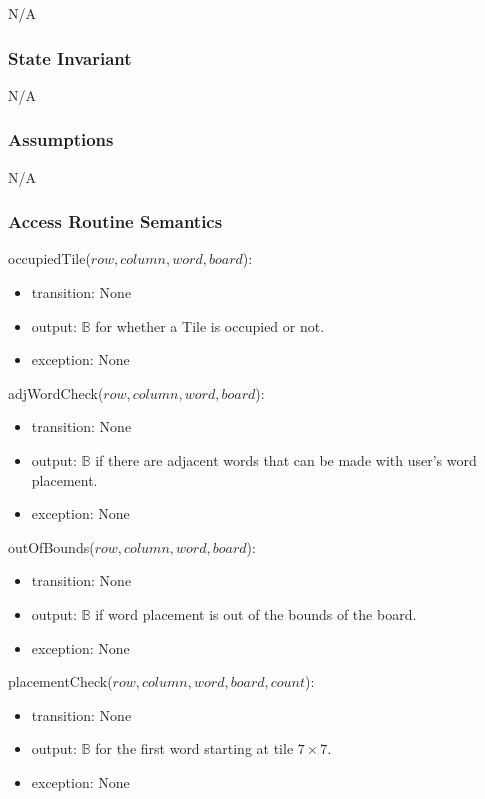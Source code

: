 \documentclass[12pt]{article}
\begin{document}
N/A

\subsubsection*{State Invariant}

N/A

\subsubsection*{Assumptions}

N/A

\subsubsection* {Access Routine Semantics}

\noindent occupiedTile($row, column, word, board$):
\begin{itemize}
\item transition: None
\item output: $\mathbb{B}$ for whether a Tile is occupied or not.
\item exception: None
\end{itemize}

\noindent adjWordCheck($row, column, word, board$):
\begin{itemize}
\item transition: None
\item output: $\mathbb{B}$ if there are adjacent words that can be made with user's word placement.
\item exception: None
\end{itemize}

\noindent outOfBounds($row, column, word, board$):
\begin{itemize}
\item transition: None
\item output: $\mathbb{B}$ if word placement is out of the bounds of the board.
\item exception: None
\end{itemize}

\noindent placementCheck($row, column, word, board, count$):
\begin{itemize}
\item transition: None
\item output: $\mathbb{B}$ for the first word starting at tile $7\times7$.
\item exception: None
\end{itemize}
\end{document}
